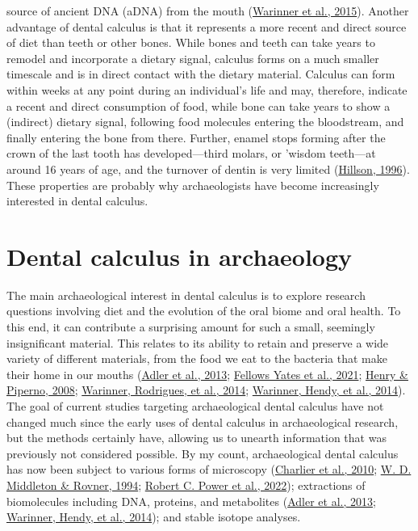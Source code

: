 \documentclass[
  letterpaper,
]{book}
\begin{document}
source of ancient DNA (aDNA) from the mouth
(\protect\hyperlink{ref-warinnerNewEra2015}{Warinner et al., 2015}).
Another advantage of dental calculus is that it represents a more recent
and direct source of diet than teeth or other bones. While bones and
teeth can take years to remodel and incorporate a dietary signal,
calculus forms on a much smaller timescale and is in direct contact with
the dietary material. Calculus can form within weeks at any point during
an individual's life and may, therefore, indicate a recent and direct
consumption of food, while bone can take years to show a (indirect)
dietary signal, following food molecules entering the bloodstream, and
finally entering the bone from there. Further, enamel stops forming
after the crown of the last tooth has developed---third molars, or
'wisdom teeth---at around 16 years of age, and the turnover of dentin is
very limited
(\protect\hyperlink{ref-hillsonDentalAnthropology1996}{Hillson, 1996}).
These properties are probably why archaeologists have become
increasingly interested in dental calculus.

\hypertarget{intro-arch}{%
\section{Dental calculus in archaeology}\label{intro-arch}}

The main archaeological interest in dental calculus is to explore
research questions involving diet and the evolution of the oral biome
and oral health. To this end, it can contribute a surprising amount for
such a small, seemingly insignificant material. This relates to its
ability to retain and preserve a wide variety of different materials,
from the food we eat to the bacteria that make their home in our mouths
(\protect\hyperlink{ref-adlerSequencingAncient2013}{Adler et al., 2013};
\protect\hyperlink{ref-yatesOralMicrobiome2021}{Fellows Yates et al.,
2021}; \protect\hyperlink{ref-henryCalculusSyria2008}{Henry \& Piperno,
2008}; \protect\hyperlink{ref-warinnerPathogensHost2014}{Warinner,
Rodrigues, et al., 2014};
\protect\hyperlink{ref-warinnerEvidenceMilk2014}{Warinner, Hendy, et
al., 2014}). The goal of current studies targeting archaeological dental
calculus have not changed much since the early uses of dental calculus
in archaeological research, but the methods certainly have, allowing us
to unearth information that was previously not considered possible. By
my count, archaeological dental calculus has now been subject to various
forms of microscopy
(\protect\hyperlink{ref-charlierSEMCalculus2010}{Charlier et al., 2010};
\protect\hyperlink{ref-middletonOpalPhytoliths1994}{W. D. Middleton \&
Rovner, 1994};
\protect\hyperlink{ref-powerSynchrotronRadiationbased2022}{Robert C.
Power et al., 2022}); extractions of biomolecules including DNA,
proteins, and metabolites
(\protect\hyperlink{ref-adlerSequencingAncient2013}{Adler et al., 2013};
\protect\hyperlink{ref-warinnerEvidenceMilk2014}{Warinner, Hendy, et
al., 2014}); and stable isotope analyses.
\end{document}
